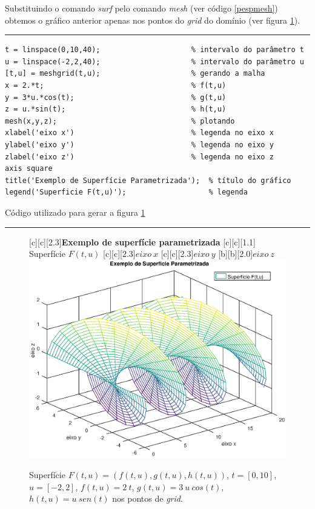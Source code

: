 Substituindo o comando {\it surf} pelo comando {\it mesh} (ver código \ref{pespmesh}) obtemos o gráfico anterior apenas nos pontos do {\it grid} do domínio (ver  figura \ref{fig.pespmesh}). 

\begin{Codigo}[htpb]
\noindent\rule{13cm}{1.pt}
\begin{verbatim}
t = linspace(0,10,40);                     % intervalo do parâmetro t 
u = linspace(-2,2,40);                     % intervalo do parâmetro u
[t,u] = meshgrid(t,u);                     % gerando a malha
x = 2.*t;                                  % f(t,u)
y = 3*u.*cos(t);                           % g(t,u)
z = u.*sin(t);                             % h(t,u)
mesh(x,y,z);                               % plotando
xlabel('eixo x')                           % legenda no eixo x
ylabel('eixo y')                           % legenda no eixo y
zlabel('eixo z')                           % legenda no eixo z
axis square
title('Exemplo de Superfície Parametrizada');  % título do gráfico 
legend('Superficie F(t,u)');                   % legenda
\end{verbatim}
\vspace{-0.5cm}
\caption{Código utilizado para gerar a figura \ref{fig.pespmesh}} 
\noindent\rule{13cm}{1.pt}
\label{pespmesh}
\end{Codigo}

\begin{figure}[htpb]
\begin{center} 
[c][c][2.3]{\textbf{Exemplo de superfície parametrizada}}
[c][c][1.1]{\hspace{0.25cm} Superfície  $F(t,u)$}
[c][c][2.3]{$eixo \ x$}
[c][c][2.3]{$eixo \ y$}
[b][b][2.0]{$eixo \ z$}
\includegraphics[angle=0,scale=0.5]{imagens/cap2/pespmesh.eps} 
\caption{Superfície $F(t,u) = (f(t,u), g(t,u), h(t,u))$, $t=[0,10]$, $u=[-2,2]$, $f(t,u)=2\ t$, $g(t,u)=3\ u\ cos(t)$, $h(t,u)=u\ sen(t)$ nos pontos de {\it grid}.} 
\label{fig.pespmesh}
\end{center}
\end{figure}

